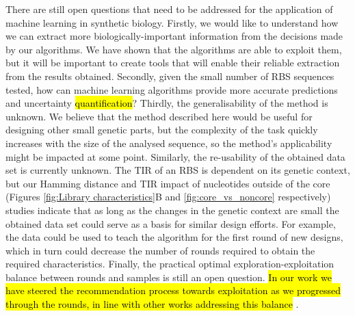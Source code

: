 \documentclass{scrartcl}[2013/05/29]%
\begin{document}
There are still open questions that need to be addressed for the application of machine learning in synthetic biology.
Firstly, we would like to understand how we can extract more biologically-important information from the decisions made by our algorithms.
We have shown that the algorithms are able to exploit them, but it will be important to create tools that will enable their reliable extraction from the results obtained.
Secondly, given the small number of RBS sequences tested, how can machine learning algorithms provide more accurate predictions and uncertainty \hl{quantification}?
Thirdly, the generalisability of the method is unknown.
We believe that the method described here would be useful for designing other small genetic parts, but the complexity of the task quickly increases with the size of the analysed sequence, so the method's applicability might be impacted at some point.
Similarly, the re-usability of the obtained data set is currently unknown.
The TIR of an RBS is dependent on its genetic context, but our Hamming distance and TIR impact of nucleotides outside of the core (Figures \ref{fig:Library characteristics}B and \ref{fig:core_vs_noncore} respectively) studies indicate that as long as the changes in the genetic context are small the obtained data set could serve as a basis for similar design efforts.
For example, the data could be used to teach the algorithm for the first round of new designs, which in turn could decrease the number of rounds required to obtain the required characteristics.
Finally, the practical optimal exploration-exploitation balance between rounds and samples is still an open question.
\hl{In our work we have steered the recommendation process towards exploitation as we progressed through the rounds, in line with other works addressing this balance} \mbox{\cite{Radivojevic2020}}.
\\
\end{document}
